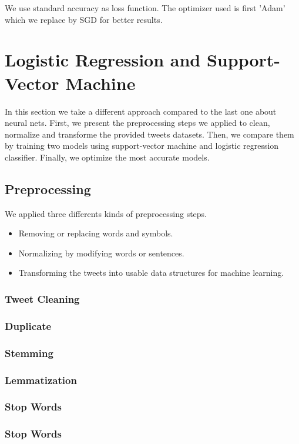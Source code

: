 \documentclass[11pt, a4paper, twocolumn]{article}
\begin{document}
We use standard accuracy as loss function. The optimizer used is first 'Adam' which we replace by SGD for better results.

\section{Logistic Regression and Support-Vector Machine}
In this section we take a different approach compared to the last one about neural nets. First, we present the preprocessing steps we applied to clean, normalize and transforme the provided tweets datasets. Then, we compare them by training two models using support-vector machine and logistic regression classifier. Finally, we optimize the most accurate models.

\subsection{Preprocessing}
We applied three differents kinds of preprocessing steps.
\begin{itemize}
	\item Removing or replacing words and symbols.
	\item Normalizing by modifying words or sentences.
	\item Transforming the tweets into usable data structures for machine learning.
\end{itemize}

\subsubsection{Tweet Cleaning}
\subsubsection{Duplicate}
\subsubsection{Stemming}
\subsubsection{Lemmatization}
\subsubsection{Stop Words}
\subsubsection{Stop Words}
\end{document}
